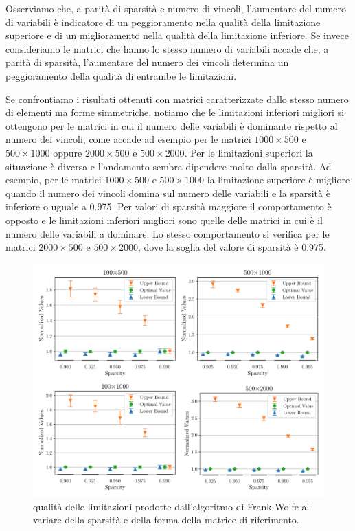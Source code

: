 Osserviamo che, a parità di sparsità e numero di vincoli, l'aumentare del numero di variabili è indicatore di un
peggioramento nella qualità della limitazione superiore e di un miglioramento nella qualità della limitazione inferiore.
Se invece consideriamo le matrici che hanno lo stesso numero di variabili accade che, a parità di sparsità, l'aumentare
del numero dei vincoli determina un peggioramento della qualità di entrambe le limitazioni.

Se confrontiamo i risultati ottenuti con matrici caratterizzate dallo stesso numero di elementi ma forme simmetriche,
notiamo che le limitazioni inferiori migliori si ottengono per le matrici in cui il numero delle variabili è dominante
rispetto al numero dei vincoli, come accade ad esempio per le matrici \( 1000\times 500 \) e \( 500\times 1000 \) oppure
\( 2000\times 500 \) e \( 500\times 2000 \). Per le limitazioni superiori la situazione è diversa e l'andamento sembra
dipendere molto dalla sparsità. Ad esempio, per le matrici \( 1000\times 500 \) e
\(
    500\times 1000
\)
la limitazione superiore è migliore quando il numero dei vincoli domina sul numero delle variabili e la sparsità è
inferiore o uguale a 0.975. Per valori di sparsità maggiore il comportamento è opposto e le limitazioni inferiori
migliori sono quelle delle matrici in cui è il numero delle variabili a dominare. Lo stesso comportamento si verifica
per le matrici \( 2000\times 500 \) e  \( 500\times 2000 \), dove la soglia del valore di sparsità è 0.975.

\begin{figure}[ht]
    \centering
    \includegraphics[width=\textwidth]{assets/figures/reverse.pdf}
    \caption{qualità delle limitazioni prodotte dall'algoritmo di Frank-Wolfe al variare della sparsità e della forma
    della matrice di riferimento.}
    \label{fig:reverse}
\end{figure}

